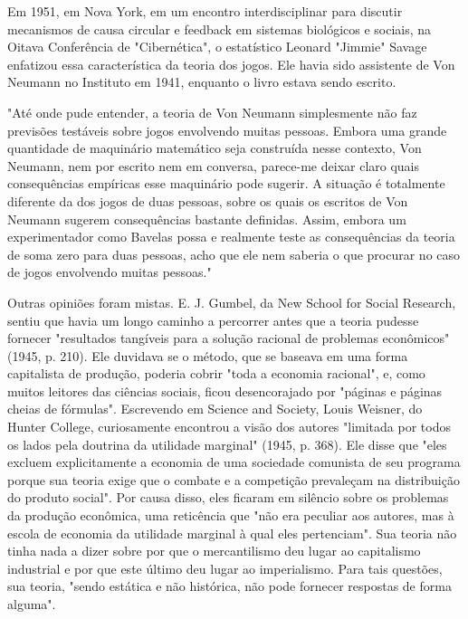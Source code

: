 \documentclass[12pt]{article}
\begin{document}
Em 1951, em Nova York, em um encontro interdisciplinar para discutir mecanismos de causa circular e feedback em sistemas biológicos e sociais, na Oitava Conferência de "Cibernética", o estatístico Leonard "Jimmie" Savage enfatizou essa característica da teoria dos jogos. Ele havia sido assistente de Von Neumann no Instituto em 1941, enquanto o livro estava sendo escrito.

"Até onde pude entender, a teoria de Von Neumann simplesmente não faz previsões testáveis sobre jogos envolvendo muitas pessoas. Embora uma grande quantidade de maquinário matemático seja construída nesse contexto, Von Neumann, nem por escrito nem em conversa, parece-me deixar claro quais consequências empíricas esse maquinário pode sugerir. A situação é totalmente diferente da dos jogos de duas pessoas, sobre os quais os escritos de Von Neumann sugerem consequências bastante definidas. Assim, embora um experimentador como Bavelas possa e realmente teste as consequências da teoria de soma zero para duas pessoas, acho que ele nem saberia o que procurar no caso de jogos envolvendo muitas pessoas."

Outras opiniões foram mistas. E. J. Gumbel, da New School for Social Research, sentiu que havia um longo caminho a percorrer antes que a teoria pudesse fornecer "resultados tangíveis para a solução racional de problemas econômicos" (1945, p. 210). Ele duvidava se o método, que se baseava em uma forma capitalista de produção, poderia cobrir "toda a economia racional", e, como muitos leitores das ciências sociais, ficou desencorajado por "páginas e páginas cheias de fórmulas". Escrevendo em Science and Society, Louis Weisner, do Hunter College, curiosamente encontrou a visão dos autores "limitada por todos os lados pela doutrina da utilidade marginal" (1945, p. 368). Ele disse que "eles excluem explicitamente a economia de uma sociedade comunista de seu programa porque sua teoria exige que o combate e a competição prevaleçam na distribuição do produto social". Por causa disso, eles ficaram em silêncio sobre os problemas da produção econômica, uma reticência que "não era peculiar aos autores, mas à escola de economia da utilidade marginal à qual eles pertenciam". Sua teoria não tinha nada a dizer sobre por que o mercantilismo deu lugar ao capitalismo industrial e por que este último deu lugar ao imperialismo. Para tais questões, sua teoria, "sendo estática e não histórica, não pode fornecer respostas de forma alguma".
\end{document}
